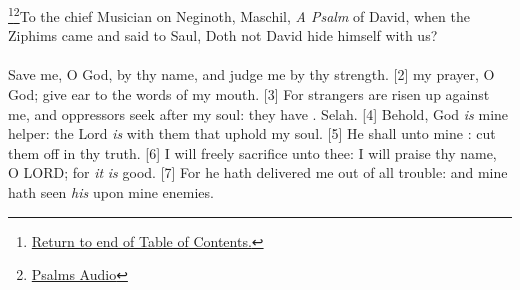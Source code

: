 

\footnote{\textcolor[rgb]{0.00,0.25,0.00}{\hyperlink{TOC}{Return to end of Table of Contents.}}}\footnote{\href{https://audiobible.com/bible/psalms_54.html}{\textcolor[cmyk]{0.99998,1,0,0}{Psalms Audio}}}\textcolor[cmyk]{0.99998,1,0,0}{To the chief Musician on Neginoth, Maschil, \emph{A Psalm} of David, when the Ziphims came and said to Saul, Doth not David hide himself with us?}\\
\\
\textcolor[cmyk]{0.99998,1,0,0}{Save me, O God, by thy name, and judge me by thy strength.}
[2] \textcolor[cmyk]{0.99998,1,0,0}{ my prayer, O God; give ear to the words of my mouth.}
[3] \textcolor[cmyk]{0.99998,1,0,0}{For strangers are risen up against me, and oppressors seek after my soul: they have . Selah.}
[4] \textcolor[cmyk]{0.99998,1,0,0}{Behold, God \emph{is} mine helper: the Lord \emph{is} with them that uphold my soul.}
[5] \textcolor[cmyk]{0.99998,1,0,0}{He shall  unto mine : cut them off in thy truth.}
[6] \textcolor[cmyk]{0.99998,1,0,0}{I will freely sacrifice unto thee: I will praise thy name, O LORD; for \emph{it} \emph{is} good.}
[7] \textcolor[cmyk]{0.99998,1,0,0}{For he hath delivered me out of all trouble: and mine  hath seen \emph{his}  upon mine enemies.}

